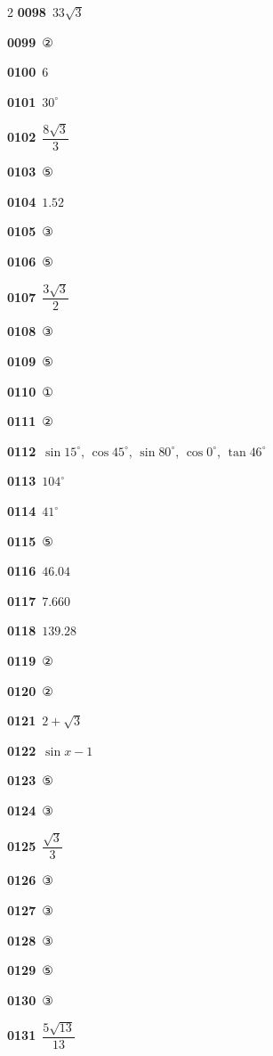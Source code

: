\documentclass[10pt,a4paper]{article}
\begin{document}
\begin{multicols}{2}
\noindent\textbf{0098}\ $33\sqrt{3}$\par
\noindent\textbf{0099}\ ②\par
\noindent\textbf{0100}\ $6$\par
\noindent\textbf{0101}\ $30^\circ$\par
\noindent\textbf{0102}\ $\dfrac{8\sqrt{3}}{3}$\par
\noindent\textbf{0103}\ ⑤\par
\noindent\textbf{0104}\ $1.52$\par
\noindent\textbf{0105}\ ③\par
\noindent\textbf{0106}\ ⑤\par
\noindent\textbf{0107}\ $\dfrac{3\sqrt{3}}{2}$\par
\noindent\textbf{0108}\ ③\par
\noindent\textbf{0109}\ ⑤\par
\noindent\textbf{0110}\ ①\par
\noindent\textbf{0111}\ ②\par
\noindent\textbf{0112}\ $\sin 15^\circ$, $\cos 45^\circ$, $\sin 80^\circ$, $\cos 0^\circ$, $\tan 46^\circ$\par
\noindent\textbf{0113}\ $104^\circ$\par
\noindent\textbf{0114}\ $41^\circ$\par
\noindent\textbf{0115}\ ⑤\par
\noindent\textbf{0116}\ $46.04$\par
\noindent\textbf{0117}\ $7.660$\par
\noindent\textbf{0118}\ $139.28$\par
\noindent\textbf{0119}\ ②\par
\noindent\textbf{0120}\ ②\par
\noindent\textbf{0121}\ $2+\sqrt{3}$\par
\noindent\textbf{0122}\ $\sin x-1$\par
\noindent\textbf{0123}\ ⑤\par
\noindent\textbf{0124}\ ③\par
\noindent\textbf{0125}\ $\dfrac{\sqrt{3}}{3}$\par
\noindent\textbf{0126}\ ③\par
\noindent\textbf{0127}\ ③\par
\noindent\textbf{0128}\ ③\par
\noindent\textbf{0129}\ ⑤\par
\noindent\textbf{0130}\ ③\par
\noindent\textbf{0131}\ $\dfrac{5\sqrt{13}}{13}$\par

\end{multicols}
\end{document}
